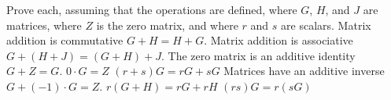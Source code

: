 
\begin{Exercise}[
name={},
title={}, 
difficulty=0,
origin={\cite{JH}}]
Prove each, assuming that the operations are defined, 
where \( G \), \( H \), and 
\( J \) are matrices, where
\( Z \) is the zero matrix, and where \( r \) and \( s \) are scalars.
\Question Matrix addition is commutative \( G+H=H+G \).
\Question Matrix addition is associative \( G+(H+J)=(G+H)+J \).
\Question The zero matrix is an additive identity \( G+Z=G \).
\Question \( 0\cdot G=Z \)
\Question \( (r+s)G=rG+sG \)
\Question Matrices have an additive inverse \( G+(-1)\cdot G=Z \).
\Question \( r(G+H)=rG+rH \)
\Question \( (rs)G=r(sG) \)
\end{Exercise}

